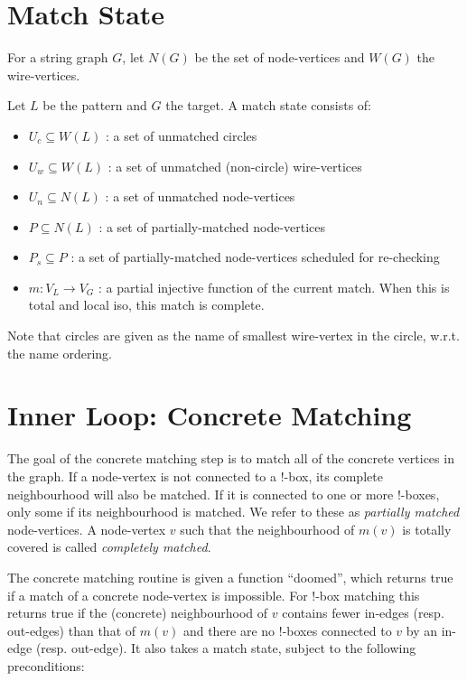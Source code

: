 \documentclass{article}
\begin{document}
\section{Match State}

For a string graph $G$, let $N(G)$ be the set of node-vertices and $W(G)$ the wire-vertices.

Let $L$ be the pattern and $G$ the target. A match state consists of:

\begin{itemize}
    \item $U_c \subseteq W(L)$ : a set of unmatched circles
    \item $U_w \subseteq W(L)$ : a set of unmatched (non-circle) wire-vertices
    \item $U_n \subseteq N(L)$ : a set of unmatched node-vertices
    \item $P \subseteq N(L)$ : a set of partially-matched node-vertices
    \item $P_s \subseteq P$ : a set of partially-matched node-vertices scheduled for re-checking
    \item $m : V_L \rightarrow V_G$ : a partial injective function of the current match. When this is total and local iso, this match is complete.
\end{itemize}

Note that circles are given as the name of smallest wire-vertex in the circle, w.r.t. the name ordering.

\section{Inner Loop: Concrete Matching}

The goal of the concrete matching step is to match all of the concrete vertices in the graph. If a node-vertex is not connected to a !-box, its complete neighbourhood will also be matched. If it is connected to one or more !-boxes, only some if its neighbourhood is matched. We refer to these as \textit{partially matched} node-vertices. A node-vertex $v$ such that the neighbourhood of $m(v)$ is totally covered is called \textit{completely matched}.

The concrete matching routine is given a function ``doomed'', which returns true if a match of a concrete node-vertex is impossible. For !-box matching this returns true if the (concrete) neighbourhood of $v$ contains fewer in-edges (resp. out-edges) than that of $m(v)$ and there are no !-boxes connected to $v$ by an in-edge (resp. out-edge). It also takes a match state, subject to the following preconditions:
\end{document}
